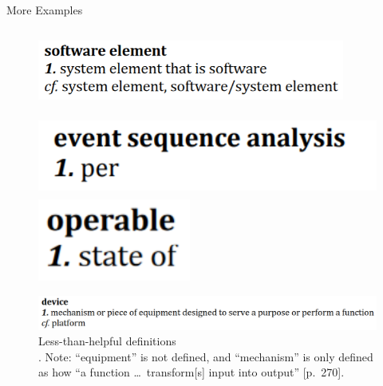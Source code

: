 \documentclass[22pt]{beamer}
\begin{document}
\begin{frame}[fragile]
\begin{textblock}{7.25}
\begin{block}{\fontsize{37}{20}\selectfont More Examples}
\begin{columns}
\begin{column}{0.525\textwidth}
                    \begin{center}
                        \begin{figure}
                            \vspace{12mm}
                            \includegraphics[width=0.9\textwidth]{software element.png}

                            \vspace{2mm}

                            \includegraphics[height=2.7cm]{per.png}
                            \includegraphics[height=2.7cm]{state of.png}

                            \vspace{2mm}

                            \includegraphics[width=\textwidth]{device.png}

                            \vspace{2mm}

                            \caption{Less-than-helpful definitions\\
                            \cite[pp.~421, 170, 136, 301 (counterclockwise from top)]{IEEE2017}.
                            Note: ``equipment'' is not defined, and
                            ``mechanism'' is only defined as how ``a function
                            \dots\ transform[s] input into output'' [p.~270].}
                            \label{Fig:unhelpful-defs}
                        \end{figure}
                    \end{center}
                \end{column}
            \end{columns}


\end{block}
\end{textblock}
\end{frame}
\end{document}
